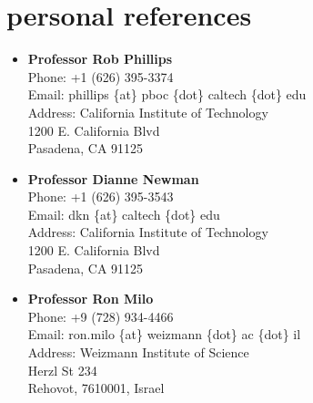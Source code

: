\documentclass[]{friggeri-cv}
\begin{document}
\section{personal references}
\begin{itemize}
	\item \textbf{Professor Rob Phillips}\\
	Phone:  +1 (626) 395-3374\\
	Email:  phillips \{at\} pboc \{dot\} caltech \{dot\} edu\\
	Address:  California Institute of Technology\\
	1200 E. California Blvd\\
	Pasadena, CA 91125
	
	\item \textbf{Professor Dianne Newman}\\
	Phone:  +1 (626)  395-3543\\
	Email:  dkn \{at\} caltech \{dot\} edu\\
	Address:  California Institute of Technology\\
	1200 E. California Blvd\\
	Pasadena, CA 91125
	
	\item \textbf{Professor Ron Milo}\\
	Phone: +9 (728) 934-4466\\
	Email:  ron.milo \{at\} weizmann \{dot\} ac \{dot\} il\\
	Address:  Weizmann Institute of Science\\
	Herzl St 234\\
	Rehovot, 7610001, Israel
\end{itemize}
\end{document}
